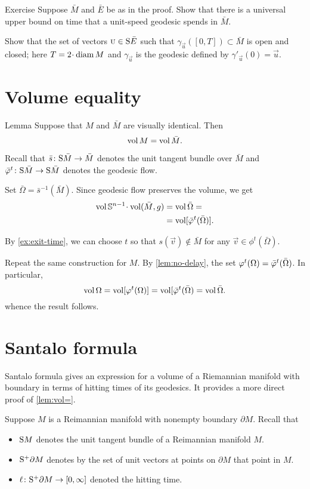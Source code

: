 \begin{thm}{Exercise}\label{ex:exit-time}
Suppose $\bar M$ and $\bar E$ be as in the proof.
Show that there is a universal upper bound on time that a unit-speed geodesic spends in $\bar M$.
\end{thm}

 Show that the set of vectors $\vec u\in\S \bar E$ such that $\gamma_{\vec u}([0, T])\subset \bar M$ is open and closed;
here $T=2\cdot\diam M$ and $\gamma_{\vec u}$ is the geodesic defined by $\gamma'_{\vec u}(0)=\vec u$.

\section{Volume equality}

\begin{thm}{Lemma}\label{lem:vol=}
Suppose that $M$ and $\bar M$ are visually identical.
Then 
\[\vol M=\vol \bar M.\]

\end{thm}

Recall that $\bar s\:\S \bar M\to \bar M$ denotes the unit tangent bundle over $\bar M$
and $\bar\phi^t\:\S \bar M\to \S \bar M$ denotes the geodesic flow.

Set $\bar\Omega=\bar s^{-1}(\bar M)$.
Since geodesic flow preserves the volume, we get 
\begin{align*}
\vol\SSS^{n-1}\cdot\vol(\bar M,g)&=\vol\bar\Omega=
\\
&=\vol[\bar\phi^t(\bar\Omega)].
\end{align*}

By \ref{ex:exit-time}, we can choose $t$ so that $s(\vec v)\notin \bar M$ for any $\vec v\in \phi^t(\bar\Omega)$.

Repeat the same construction for $M$. 
By \ref{lem:no-delay}, the set $\phi^t(\Omega)\z=\bar\phi^t(\bar\Omega)$.
In particular, 
\[
\vol\Omega=
\vol[\phi^t(\Omega)]=\vol[\bar\phi^t(\bar\Omega)=\vol\bar\Omega.
\]
whence the result follows.
\qeds

\section{Santalo formula}

Santalo formula gives an expression for a volume of a Riemannian manifold with boundary in terms of hitting times of its geodesics.
It provides a more direct proof of \ref{lem:vol=}.

Suppose $M$ is a Reimannian manifold with nonempty boundary $\partial M$.
Recall that 
\begin{itemize}
\item $\S M$ denotes the unit tangent bundle of a Reimannian manifold $M$.
\item $\S^+ \partial M$ denotes by the set of unit vectors at points on $\partial M$ that point in $M$.
\item $\ell\:\S^+ \partial M\to [0,\infty]$ denoted the hitting time.
\end{itemize}

